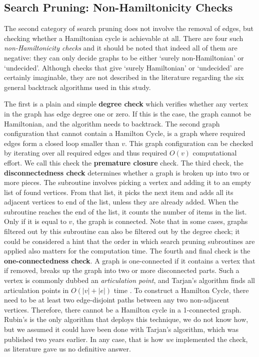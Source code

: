 \documentclass[10pt,conference,compsocconf]{IEEEtran}
\begin{document}
\subsection{Search Pruning: Non-Hamiltonicity Checks}
  
\noindent The second category of search pruning does not involve the removal of edges, but checking whether a Hamiltonian cycle is achievable at all. There are four such \textit{non-Hamiltonicity checks} and it should be noted that indeed all of them are negative: they can only decide graphs to be either `surely non-Hamiltonian' or `undecided'. Although checks that give `surely Hamiltonian' or `undecided' are certainly imaginable, they are not described in the literature regarding the six general backtrack algorithms used in this study.

The first is a plain and simple \textbf{degree check} which verifies whether any vertex in the graph has edge degree one or zero. If this is the case, the graph cannot be Hamiltonian, and the algorithm needs to backtrack. The second graph configuration that cannot contain a Hamilton Cycle, is a graph where required edges form a closed loop smaller than $v$. This graph configuration can be checked by iterating over all required edges and thus required $O(v)$ computational effort. We call this check the \textbf{premature closure} check. The third check, the \textbf{disconnectedness check} determines whether a graph is broken up into two or more pieces. The subroutine involves picking a vertex and adding it to an empty list of found vertices. From that list, it picks the next item and adds all its adjacent vertices to end of the list, unless they are already added. When the subroutine reaches the end of the list, it counts the number of items in the list. Only if it is equal to $v$, the graph is connected. Note that in some cases, graphs filtered out by this subroutine can also be filtered out by the degree check; it could be considered a hint that the order in which search pruning subroutines are applied also matters for the computation time. The fourth and final check is the  \textbf{one-connectedness check}. A graph is one-connected if it contains a vertex that if removed, breaks up the graph into two or more disconnected parts. Such a vertex is commonly dubbed an \textit{articulation point}, and Tarjan's algorithm finds all articulation points in $O(|v|+|e|)$ time \cite{tarjan1972depth}. To construct a Hamilton Cycle,  there need to be at least two edge-disjoint paths between any two non-adjacent vertices. Therefore, there cannot be a Hamilton cycle in a 1-connected graph. Rubin's is the only algorithm that deploys this technique, we do not know how, but we assumed it could have been done with Tarjan's algorithm, which was published two years earlier. In any case, that is how \textit{we} implemented the check, as literature gave us no definitive answer.
\end{document}
